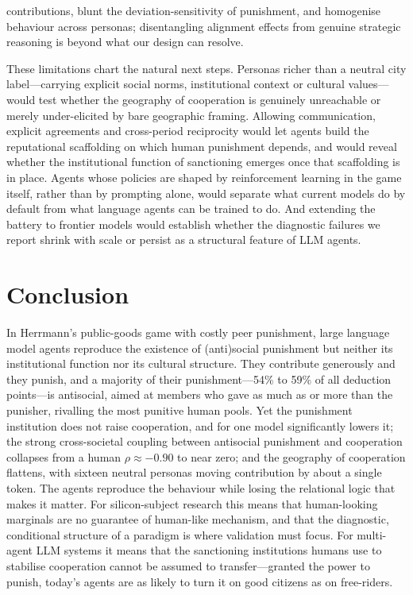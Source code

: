 \documentclass[openacc]{rsproca_new}
\begin{document}
contributions, blunt the deviation-sensitivity of punishment, and homogenise behaviour across personas; disentangling alignment effects from genuine strategic reasoning is beyond what our design can resolve.

These limitations chart the natural next steps. Personas richer than a neutral city label---carrying explicit social norms, institutional context or cultural values---would test whether the geography of cooperation is genuinely unreachable or merely under-elicited by bare geographic framing. Allowing communication, explicit agreements and cross-period reciprocity would let agents build the reputational scaffolding on which human punishment depends, and would reveal whether the institutional function of sanctioning emerges once that scaffolding is in place. Agents whose policies are shaped by reinforcement learning in the game itself, rather than by prompting alone, would separate what current models do by default from what language agents can be trained to do. And extending the battery to frontier models would establish whether the diagnostic failures we report shrink with scale or persist as a structural feature of LLM agents.

\section{Conclusion}

In Herrmann's public-goods game with costly peer punishment, large language model agents reproduce the existence of (anti)social punishment but neither its institutional function nor its cultural structure. They contribute generously and they punish, and a majority of their punishment---54\% to 59\% of all deduction points---is antisocial, aimed at members who gave as much as or more than the punisher, rivalling the most punitive human pools. Yet the punishment institution does not raise cooperation, and for one model significantly lowers it; the strong cross-societal coupling between antisocial punishment and cooperation collapses from a human $\rho\approx-0.90$ to near zero; and the geography of cooperation flattens, with sixteen neutral personas moving contribution by about a single token. The agents reproduce the behaviour while losing the relational logic that makes it matter. For silicon-subject research this means that human-looking marginals are no guarantee of human-like mechanism, and that the diagnostic, conditional structure of a paradigm is where validation must focus. For multi-agent LLM systems it means that the sanctioning institutions humans use to stabilise cooperation cannot be assumed to transfer---granted the power to punish, today's agents are as likely to turn it on good citizens as on free-riders.
\end{document}
